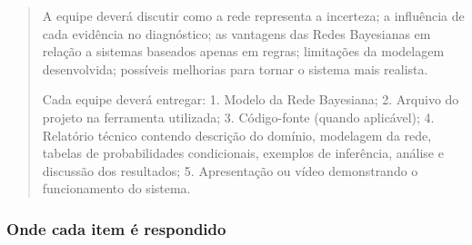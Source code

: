 \documentclass[12pt, a4paper]{article}
\begin{document}
\begin{quote}
A equipe deverá discutir como a rede representa a incerteza; a influência de cada evidência no diagnóstico; as vantagens das Redes Bayesianas em relação a sistemas baseados apenas em regras; limitações da modelagem desenvolvida; possíveis melhorias para tornar o sistema mais realista.

Cada equipe deverá entregar: 1. Modelo da Rede Bayesiana; 2. Arquivo do projeto na ferramenta utilizada; 3. Código-fonte (quando aplicável); 4. Relatório técnico contendo descrição do domínio, modelagem da rede, tabelas de probabilidades condicionais, exemplos de inferência, análise e discussão dos resultados; 5. Apresentação ou vídeo demonstrando o funcionamento do sistema.
\end{quote}

\subsubsection{Onde cada item é respondido}\label{onde-cada-item-uxe9-respondido}
\end{document}
